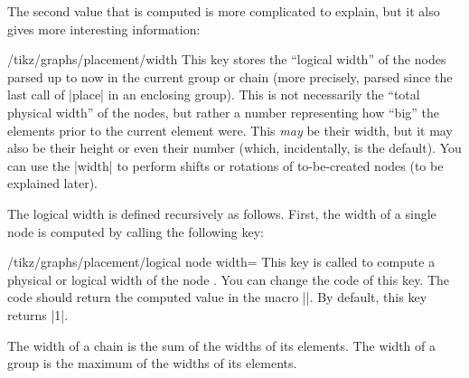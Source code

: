 The second value that is computed is more complicated to explain, but it also
gives more interesting information:
%
\begin{key}{/tikz/graphs/placement/width}
    This key stores the ``logical width'' of the nodes parsed up to now in the
    current group or chain (more precisely, parsed since the last call of
    |place| in an enclosing group). This is not necessarily the ``total
    physical width'' of the nodes, but rather a number representing how ``big''
    the elements prior to the current element were. This \emph{may} be their
    width, but it may also be their height or even their number (which,
    incidentally, is the default). You can use the |width| to perform shifts or
    rotations of to-be-created nodes (to be explained later).

    The logical width is defined recursively as follows. First, the width of a
    single node is computed by calling the following key:
    \begin{key}{/tikz/graphs/placement/logical node width=}
        This key is called to compute a physical or logical width of the node
        . You can change the code of this key. The code
        should return the computed value in the macro |\pgfmathresult|. By
        default, this key returns |1|.
    \end{key}
    The width of a chain is the sum of the widths of its elements. The width of
    a group is the maximum of the widths of its elements.


\end{key}
